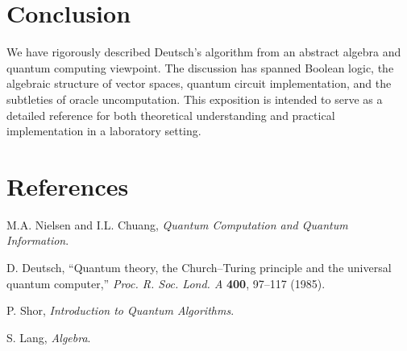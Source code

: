 \documentclass[11pt,oneside]{book}
\theoremstyle{remark}
\begin{document}
	\chapter{Conclusion}
	We have rigorously described Deutsch's algorithm from an abstract algebra and quantum computing viewpoint. The discussion has spanned Boolean logic, the algebraic structure of vector spaces, quantum circuit implementation, and the subtleties of oracle uncomputation. This exposition is intended to serve as a detailed reference for both theoretical understanding and practical implementation in a laboratory setting.
	
	\backmatter
	\chapter{References}
	\begin{enumerate}[label={[\arabic*]}]
		\item M.A. Nielsen and I.L. Chuang, \emph{Quantum Computation and Quantum Information}.
		\item D. Deutsch, ``Quantum theory, the Church--Turing principle and the universal quantum computer,'' \emph{Proc. R. Soc. Lond. A} \textbf{400}, 97--117 (1985).
		\item P. Shor, \emph{Introduction to Quantum Algorithms}.
		\item S. Lang, \emph{Algebra}.
	\end{enumerate}
	
\end{document}
